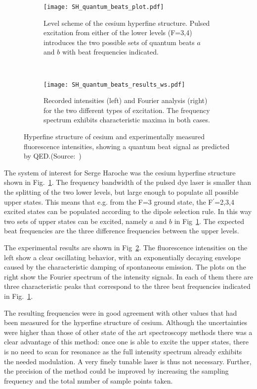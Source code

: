 \begin{figure}[t]
  \centering
  \begin{subfigure}[t]{0.48\linewidth}
    \centering
    \texttt{[image: SH\_quantum\_beats\_plot.pdf]}
    \caption{Level scheme of the cesium hyperfine structure. Pulsed excitation
    from either of the lower levels (F=3,4) introduces the two possible sets of
  quantum beats $a$ and $b$ with beat frequencies indicated.}
    \label{fig:cs_level_scheme}
  \end{subfigure}
  ~
  \begin{subfigure}[t]{0.48\linewidth}
    \centering
    \texttt{[image: SH\_quantum\_beats\_results\_ws.pdf]}
    \caption{Recorded intensities (left) and Fourier analysis (right) for the
    two different types of excitation. The frequency spectrum exhibits
  characteristic maxima in both cases.}
    \label{fig:cs_beat_results}
  \end{subfigure}
  \caption{Hyperfine structure of cesium and experimentally measured
    fluorescence intensities, showing a
     quantum beat signal as predicted by
  QED.(Source:~\cite{haroche1973hyperfine})}
  \label{fig:quantum_beats_experiment}
\end{figure}

The system of interest for Serge Haroche was the cesium hyperfine structure
shown in Fig.~\ref{fig:cs_level_scheme}. The frequency bandwidth of the pulsed
dye laser is smaller than the splitting of the two lower levels, but large
enough to populate all possible upper states. This means that e.g. from the F=3
ground state, the F$^\prime$=2,3,4 excited states can be populated according to
the dipole selection rule. In this way two sets of upper states can be excited,
namely $a$ and $b$ in Fig~\ref{fig:cs_level_scheme}. The expected beat
frequencies are the three difference frequencies between the upper levels.

The experimental results are shown in Fig~\ref{fig:cs_beat_results}. The
fluorescence intensities on the left show a clear oscillating behavior, with an
exponentially decaying envelope caused by the characteristic damping of
spontaneous emission. The plots on the right show the Fourier spectrum of the
intensity signals. In each of them there are three characteristic peaks that
correspond to the three beat frequencies indicated in
Fig.~\ref{fig:cs_level_scheme}. 

The resulting frequencies were in good agreement with other values that had been
measured for the hyperfine structure of cesium. Although the uncertainties were
higher than those of other state of the art spectroscopy methods there was a
clear advantage of this method: once one is able to excite the upper states,
there is no need to scan for resonance as the full intensity spectrum already
exhibits the needed modulation. A very finely tunable laser is thus not
necessary. Further, the precision of the method could be improved by increasing
the sampling frequency and the total number of sample points taken.


